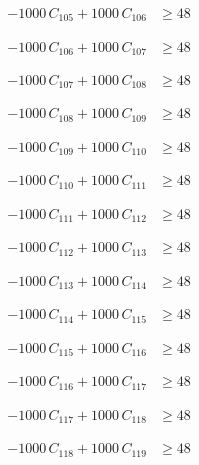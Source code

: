 \documentclass[a4paper,11pt]{article}
\begin{document}
\begin{align}
-1000\,C_{105} + 1000\,C_{106} &\geq 48 \nonumber
\end{align}

\begin{align}
-1000\,C_{106} + 1000\,C_{107} &\geq 48 \nonumber
\end{align}

\begin{align}
-1000\,C_{107} + 1000\,C_{108} &\geq 48 \nonumber
\end{align}

\begin{align}
-1000\,C_{108} + 1000\,C_{109} &\geq 48 \nonumber
\end{align}

\begin{align}
-1000\,C_{109} + 1000\,C_{110} &\geq 48 \nonumber
\end{align}

\begin{align}
-1000\,C_{110} + 1000\,C_{111} &\geq 48 \nonumber
\end{align}

\begin{align}
-1000\,C_{111} + 1000\,C_{112} &\geq 48 \nonumber
\end{align}

\begin{align}
-1000\,C_{112} + 1000\,C_{113} &\geq 48 \nonumber
\end{align}

\begin{align}
-1000\,C_{113} + 1000\,C_{114} &\geq 48 \nonumber
\end{align}

\begin{align}
-1000\,C_{114} + 1000\,C_{115} &\geq 48 \nonumber
\end{align}

\begin{align}
-1000\,C_{115} + 1000\,C_{116} &\geq 48 \nonumber
\end{align}

\begin{align}
-1000\,C_{116} + 1000\,C_{117} &\geq 48 \nonumber
\end{align}

\begin{align}
-1000\,C_{117} + 1000\,C_{118} &\geq 48 \nonumber
\end{align}

\begin{align}
-1000\,C_{118} + 1000\,C_{119} &\geq 48 \nonumber
\end{align}
\end{document}
